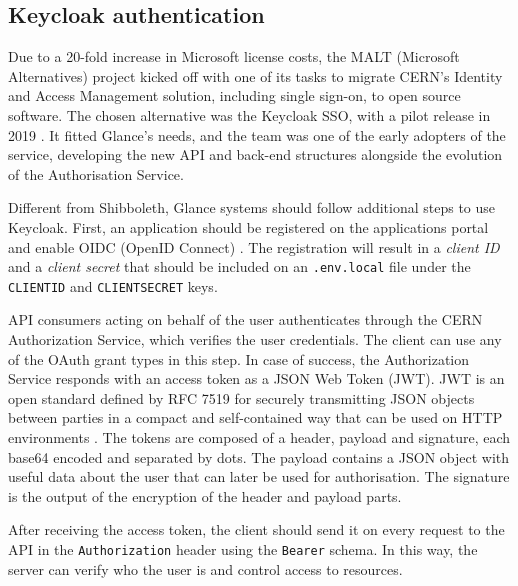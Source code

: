 \subsection{Keycloak authentication}

Due to a 20-fold increase in Microsoft license costs, the MALT (Microsoft Alternatives) \cite{malt} \cite{malt-internal} \cite{malt-auth} project kicked off with one of its tasks to migrate CERN's Identity and Access Management solution, including single sign-on, to open source software. The chosen alternative was the Keycloak SSO, with a pilot release in 2019 \cite{keycloak-article}. It fitted Glance's needs, and the team was one of the early adopters of the service, developing the new API and back-end structures alongside the evolution of the Authorisation Service.

Different from Shibboleth, Glance systems should follow additional steps to use Keycloak. First, an application should be registered on the applications portal and enable OIDC (OpenID Connect) \cite{registering-application} \cite{cern-auth-oidc-guide}. The registration will result in a \textit{client ID} and a \textit{client secret} that should be included on an \texttt{.env.local} file under the \texttt{CLIENT\textunderscore ID} and \texttt{CLIENT\textunderscore SECRET} keys.

API consumers acting on behalf of the user authenticates through the CERN Authorization Service, which verifies the user credentials. The client can use any of the OAuth grant types \cite{oauth-grant-type} in this step.  In case of success, the Authorization Service responds with an access token as a JSON Web Token (JWT). JWT is an open standard defined by RFC 7519 \cite{rfc-7519} for securely transmitting JSON objects between parties in a compact and self-contained way that can be used on HTTP environments \cite{jwt-introduction}. The tokens are composed of a header, payload and signature, each base64 encoded and separated by dots. The payload contains a JSON object with useful data about the user that can later be used for authorisation. The signature is the output of the encryption of the header and payload parts.


After receiving the access token, the client should send it on every request to the API in the \texttt{Authorization} header using the \texttt{Bearer} schema. In this way, the server can verify who the user is and control access to resources.

